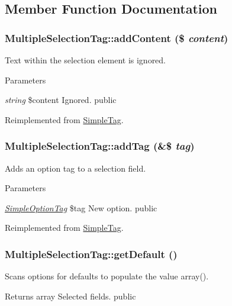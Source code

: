 \subsection{Member Function Documentation}
\hypertarget{class_multiple_selection_tag_a189718260cdafedf3038e7aa9cdcf381}{
\subsubsection[{addContent}]{\setlength{\rightskip}{0pt plus 5cm}MultipleSelectionTag::addContent (\$ {\em content})}}
\label{class_multiple_selection_tag_a189718260cdafedf3038e7aa9cdcf381}
Text within the selection element is ignored. 
\begin{DoxyParams}{Parameters}
\item[{\em string}]\$content Ignored.  public \end{DoxyParams}


Reimplemented from \hyperlink{class_simple_tag_ae8478a7c35ab3c16e8284667cd5f0bd5}{SimpleTag}.\hypertarget{class_multiple_selection_tag_a3dff5d342339cf7f4d07acc3826e807f}{
\subsubsection[{addTag}]{\setlength{\rightskip}{0pt plus 5cm}MultipleSelectionTag::addTag (\&\$ {\em tag})}}
\label{class_multiple_selection_tag_a3dff5d342339cf7f4d07acc3826e807f}
Adds an option tag to a selection field. 
\begin{DoxyParams}{Parameters}
\item[{\em \hyperlink{class_simple_option_tag}{SimpleOptionTag}}]\$tag New option.  public \end{DoxyParams}


Reimplemented from \hyperlink{class_simple_tag_a5f5cc331c052dd6eb0bd104f68143c76}{SimpleTag}.\hypertarget{class_multiple_selection_tag_a3fa45878dee4cde402bc5a36dc3b3a80}{
\subsubsection[{getDefault}]{\setlength{\rightskip}{0pt plus 5cm}MultipleSelectionTag::getDefault ()}}
\label{class_multiple_selection_tag_a3fa45878dee4cde402bc5a36dc3b3a80}
Scans options for defaults to populate the value array(). \begin{DoxyReturn}{Returns}
array Selected fields.  public 
\end{DoxyReturn}



